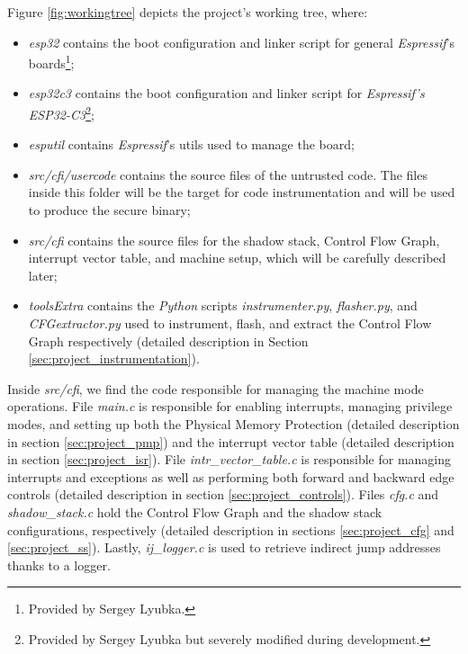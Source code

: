 Figure \ref{fig:workingtree} depicts the project's working tree, where:

\begin{itemize}
  \item \textit{esp32} contains the boot configuration and linker script for
    general \textit{Espressif}'s boards\footnote{Provided by Sergey Lyubka.};

  \item \textit{esp32c3} contains the boot configuration and linker script for
    \textit{Espressif's ESP32-C3}\footnote{Provided by Sergey Lyubka but
    severely modified during development.};

  \item \textit{esputil} contains \textit{Espressif}'s utils used to manage the board;

  \item \textit{src/cfi/usercode} contains the source files of the untrusted
    code. The files inside this folder will be the target for code instrumentation
    and will be used to produce the secure binary;

  \item \textit{src/cfi} contains the source files for the shadow stack, Control
    Flow Graph, interrupt vector table, and machine setup, which will be
    carefully described later;

  \item \textit{toolsExtra} contains the \textit{Python} scripts \textit{instrumenter.py},
    \textit{flasher.py}, and \textit{CFGextractor.py} used to instrument, flash,
    and extract the Control Flow Graph respectively (detailed description in Section
    \ref{sec:project_instrumentation}).
\end{itemize}

Inside \textit{src/cfi}, we find the code responsible for managing the machine
mode operations. File \textit{main.c} is responsible for enabling interrupts, managing
privilege modes, and setting up both the Physical Memory Protection (detailed description
in section \ref{sec:project_pmp}) and the interrupt vector table (detailed description
in section \ref{sec:project_isr}). File \textit{intr\_vector\_table.c} is
responsible for managing interrupts and exceptions as well as performing both
forward and backward edge controls (detailed description in section \ref{sec:project_controls}).
Files \textit{cfg.c} and \textit{shadow\_stack.c} hold the Control Flow Graph and
the shadow stack configurations, respectively (detailed description in sections \ref{sec:project_cfg}
and \ref{sec:project_ss}). Lastly, \textit{ij\_logger.c} is used to retrieve indirect
jump addresses thanks to a logger.

